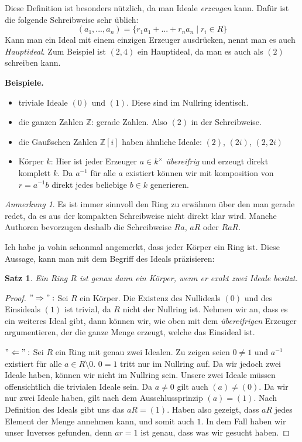 \documentclass{article}
\newtheorem*{satz}{Satz}
\theoremstyle{definition}
\theoremstyle{remark}
\newtheorem*{anm}{Anmerkung}
\begin{document}
Diese Definition ist besonders nützlich, da man Ideale \emph{erzeugen} kann. Dafür ist die folgende
Schreibweise sehr üblich:
\[(a_1,...,a_n)=\{r_1 a_1 + ... + r_n a_n \mid r_i\in R\}\]
Kann man ein Ideal mit einem einzigen Erzeuger ausdrücken, nennt man es auch \emph{Hauptideal}. Zum Beispiel
ist $(2,4)$ ein Hauptideal, da man es auch als $(2)$ schreiben kann.

\vspace{0.7em}
\textbf{Beispiele.}
\begin{itemize}
    \item triviale Ideale $(0)$ und $(1)$. Diese sind im Nullring identisch.
    \item die ganzen Zahlen $\mathbb Z$: gerade Zahlen. Also $(2)$ in der Schreibweise.
    \item die Gaußschen Zahlen $\mathbb Z[i]$ haben ähnliche Ideale: $(2)$, $(2i)$, $(2,2i)$
    \item Körper $k$: Hier ist jeder Erzeuger $a\in k^\times$ \emph{übereifrig} und erzeugt direkt komplett $k$.        Da $a^{-1}$ für alle $a$ existiert können wir mit komposition von $r=a^{-1}b$ direkt jedes beliebige            $b\in k$ generieren.
\end{itemize}

\begin{anm}
Es ist immer sinnvoll den Ring zu erwähnen über den man gerade redet, da es aus der kompakten Schreibweise
nicht direkt klar wird. Manche Authoren bevorzugen deshalb die Schreibweise $Ra$, $aR$ oder $RaR$.
\end{anm}

Ich habe ja vohin schonmal angemerkt, dass jeder Körper ein Ring ist. Diese Aussage, kann man mit dem
Begriff des Ideals präzisieren:

\begin{satz}
Ein Ring $R$ ist genau dann ein Körper, wenn er exakt zwei Ideale besitzt.
\end{satz}
\begin{proof} $"\Rightarrow":$ Sei $R$ ein Körper. Die Existenz des Nullideals $(0)$ und des Einsideals $(1)$
ist trivial, da $R$ nicht der Nullring ist. Nehmen wir an, dass es ein weiteres Ideal gibt, dann können wir,
wie oben mit dem \emph{übereifrigen} Erzeuger argumentieren, der die ganze Menge erzeugt, welche das Einsideal
ist.

\vspace{0.7em}
$"\Leftarrow":$ Sei $R$ ein Ring mit genau zwei Idealen. Zu zeigen seien $0\ne1$ und $a^{-1}$ existiert für
alle $a\in R\setminus 0$. $0=1$ tritt nur im Nullring auf. Da wir jedoch zwei Ideale haben, können wir nicht im
Nullring sein. Unsere zwei Ideale müssen offensichtlich die trivialen Ideale sein. Da $a\ne0$ gilt auch
$(a)\ne(0)$. Da wir nur zwei Ideale haben, gilt nach dem Ausschlussprinzip $(a)=(1)$. Nach Definition des Ideals gibt uns das
$aR=(1)$. Haben also gezeigt, dass $aR$ jedes Element der Menge annehmen kann, und somit auch $1$. In dem Fall
haben wir unser Inverses gefunden, denn $ar=1$ ist genau, dass was wir gesucht haben.
\end{proof}
\end{document}
